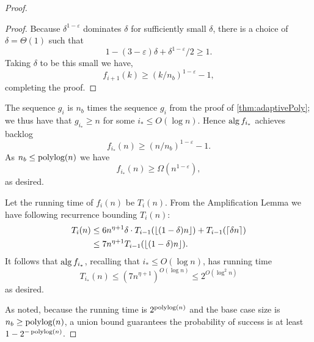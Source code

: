 \begin{proof}
\begin{proof}
  Because $\delta^{1-\varepsilon}$ dominates $\delta$ for
  sufficiently small $\delta$, there is a choice of
  $\delta=\Theta(1)$ such that 
  $$1-(3-\varepsilon)\delta + \delta^{1-\varepsilon}/2 \ge 1.$$ 
  Taking $\delta$ to be this small we have,
  $$f_{i+1}(k) \ge (k/n_b)^{1-\varepsilon}-1,$$
  completing the proof. 
  \end{proof}

  The sequence $g_i$ is $n_b$ times the sequence $g_i$ from
  the proof of \cref{thm:adaptivePoly}; we thus have that $g_{i_*}
  \ge n$ for some $i_* \le O(\log n)$.
  Hence $\operatorname{\text{\textup{alg}}}{f_{i_*}}$ achieves backlog 
  $$f_{i_*}(n) \ge (n/n_b)^{1-\varepsilon}-1.$$
  As $n_b \le \operatorname{\text{polylog}}(n)$ we have
  $$f_{i_*}(n) \ge \Omega(n^{1-\varepsilon}),$$ as desired.

  Let the running time of $f_i(n)$ be $T_i(n)$. From the Amplification Lemma we have following recurrence bounding $T_i(n)$:
  \begin{align*}
    T_i(n) &\le 6n^{\eta+1} \delta \cdot T_{i-1}(\left\lfloor (1-\delta)n \right\rfloor) +
  T_{i-1}(\left\lceil \delta n \right\rceil) \\
  &\le 7n^{\eta+1}T_{i-1}(\left\lfloor (1-\delta)n \right\rfloor).
  \end{align*}
  It follows that $\operatorname{\text{\textup{alg}}}{f_{i_*}}$, recalling that $i_* \le O(\log n)$, has running time
  $$T_{i_*}(n) \le (7n^{\eta+1})^{O(\log n)} \le 2^{O(\log^2 n)}$$
  as desired.

  As noted, because the running time is $2^{\operatorname{\text{polylog}}(n)}$ and the
  base case size is $n_b\ge \operatorname{\text{polylog}}(n)$, a union bound
  guarantees the probability of success is at least
  $1-2^{-\operatorname{\text{polylog}}(n)}$.
\end{proof}


